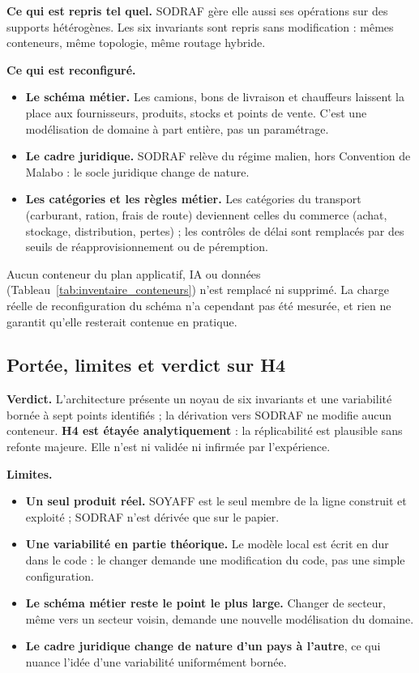 \textbf{Ce qui est repris tel quel.} SODRAF gère elle aussi ses opérations sur des supports hétérogènes. Les six invariants sont repris sans modification : mêmes conteneurs, même topologie, même routage hybride.

\textbf{Ce qui est reconfiguré.}
\begin{itemize}
    \item \textbf{Le schéma métier.} Les camions, bons de livraison et chauffeurs laissent la place aux fournisseurs, produits, stocks et points de vente. C'est une modélisation de domaine à part entière, pas un paramétrage.
    \item \textbf{Le cadre juridique.} SODRAF relève du régime malien, hors Convention de Malabo : le socle juridique change de nature.
    \item \textbf{Les catégories et les règles métier.} Les catégories du transport (carburant, ration, frais de route) deviennent celles du commerce (achat, stockage, distribution, pertes) ; les contrôles de délai sont remplacés par des seuils de réapprovisionnement ou de péremption.
\end{itemize}

Aucun conteneur du plan applicatif, IA ou données (Tableau~\ref{tab:inventaire_conteneurs}) n'est remplacé ni supprimé. La charge réelle de reconfiguration du schéma n'a cependant pas été mesurée, et rien ne garantit qu'elle resterait contenue en pratique.

\subsection{Portée, limites et verdict sur H4}
\label{sec:spl_limites}

\textbf{Verdict.} L'architecture présente un noyau de six invariants et une variabilité bornée à sept points identifiés ; la dérivation vers SODRAF ne modifie aucun conteneur. \textbf{H4 est étayée analytiquement} : la réplicabilité est plausible sans refonte majeure. Elle n'est ni validée ni infirmée par l'expérience.

\textbf{Limites.}
\begin{itemize}
    \item \textbf{Un seul produit réel.} SOYAFF est le seul membre de la ligne construit et exploité ; SODRAF n'est dérivée que sur le papier.
    \item \textbf{Une variabilité en partie théorique.} Le modèle local est écrit en dur dans le code : le changer demande une modification du code, pas une simple configuration.
    \item \textbf{Le schéma métier reste le point le plus large.} Changer de secteur, même vers un secteur voisin, demande une nouvelle modélisation du domaine.
    \item \textbf{Le cadre juridique change de nature d'un pays à l'autre}, ce qui nuance l'idée d'une variabilité uniformément bornée.
\end{itemize}

